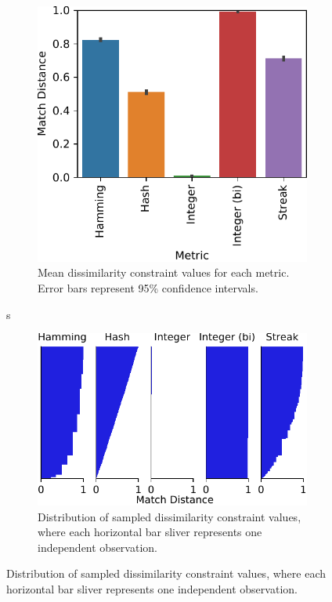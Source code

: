 \begin{figure}
\begin{center}
\begin{subfigure}[b]{\linewidth}
\begin{minipage}{0.6\linewidth}
\includegraphics[width=\linewidth]{img/sphere_reverse/bitweight=0dot5+seed=1+title=dimensionality_barplot+_data_hathash_hash=93f97a11cb443d35+_script_fullcat_hash=03ce1e318a24a109+ext=}
\end{minipage}
\begin{minipage}{0.35\linewidth}
\caption{
Mean dissimilarity constraint values for each metric.
Error bars represent 95\% confidence intervals.
}
\label{fig:sphere_reverse_distnplot}
\end{minipage}
\end{subfigure}
s
\begin{subfigure}[b]{\columnwidth}
\centering
\includegraphics[width=\columnwidth]{img/sphere_reverse/bitweight=0dot5+seed=1+title=dimensionality_distnplot+_data_hathash_hash=93f97a11cb443d35+_script_fullcat_hash=03ce1e318a24a109+ext=}
\caption{
Distribution of sampled dissimilarity constraint values, where each horizontal bar sliver represents one independent observation.
}
\label{fig:sphere_reverse_barplot}
\end{subfigure}


\end{center}
\end{figure}
